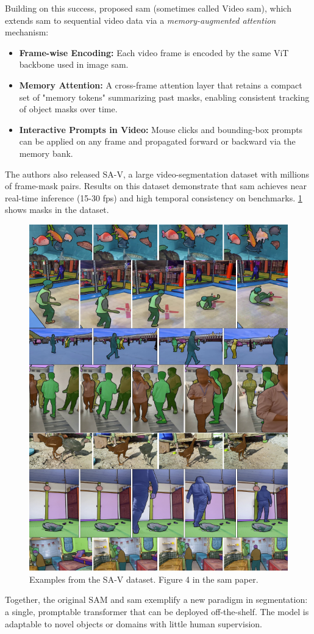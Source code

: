 Building on this success, \textcite{ravi_sam_nodate} proposed \acrfull{sam} (sometimes called Video \acrshort{sam}), which extends \acrshort{sam} to sequential video data via a \emph{memory-augmented attention} mechanism:
\begin{itemize}
    \item \textbf{Frame-wise Encoding:} Each video frame is encoded by the same ViT backbone used in image \acrshort{sam}.
    \item \textbf{Memory Attention:} A cross-frame attention layer that retains a compact set of "memory tokens" summarizing past masks, enabling consistent tracking of object masks over time.
    \item \textbf{Interactive Prompts in Video:} Mouse clicks and bounding-box prompts can be applied on any frame and propagated forward or backward via the memory bank.
\end{itemize}

The authors also released SA-V, a large video-segmentation dataset with millions of frame-mask pairs. Results on this dataset demonstrate that \acrshort{sam} achieves near real-time inference (15-30 fps) and high temporal consistency on benchmarks. \cref{fig:sa-v} shows masks in the dataset. 

\begin{figure}
    \centering
    \includegraphics[width=0.5\linewidth]{figures/sam_2.png}
    \caption{Examples from the SA-V dataset. Figure 4 in the \acrshort{sam} paper\cite{ravi_sam_nodate}.}
    \label{fig:sa-v}
\end{figure}

Together, the original SAM and \acrshort{sam} exemplify a new paradigm in segmentation: a single, promptable transformer that can be deployed off-the-shelf. The model is adaptable to novel objects or domains with little human supervision. 

